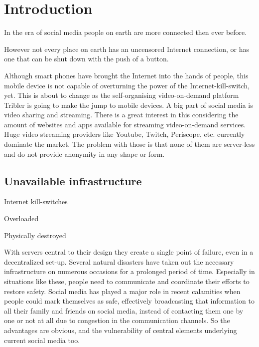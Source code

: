 

\chapter{Introduction}

In the era of social media people on earth are more connected then ever before.

However not every place on earth has an uncensored Internet connection, or has one that can be shut down with the push of a button.

Although smart phones have brought the Internet into the hands of people, this mobile device is not capable of overturning the power of the Internet-kill-switch, yet.
This is about to change as the self-organising video-on-demand platform Tribler is going to make the jump to mobile devices.
A big part of social media is video sharing and streaming.
There is a great interest in this considering the amount of websites and apps available for streaming video-on-demand services.
Huge video streaming providers like Youtube, Twitch, Periscope, etc. currently dominate the market.
The problem with those is that none of them are server-less and do not  provide anonymity in any shape or form.


\section{Unavailable infrastructure}

Internet kill-switches

Overloaded

Physically destroyed

With servers central to their design they create a single point of failure, even in a decentralized set-up.
Several natural disasters have taken out the necessary infrastructure on numerous occasions for a prolonged period of time.
Especially in situations like these, people need to communicate and coordinate their efforts to restore safety.
Social media has played a major role in recent calamities when people could mark themselves as safe, effectively broadcasting that information to all their family and friends on social media, instead of contacting them one by one or not at all due to congestion in the communication channels.
So the advantages are obvious, and the vulnerability of central elements underlying current social media too.



